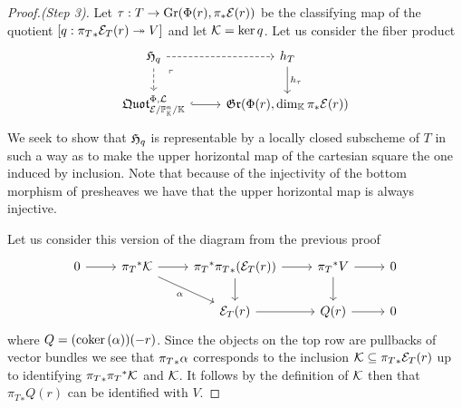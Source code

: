 \begin{proof}[Proof.(Step 3)]
Let $\tau:T\to \mathrm{Gr}(\Phi(r),\pi_\ast\mathcal{E}(r))$ be the classifying map of the quotient $[q:{\pi_T}_\ast\mathcal{E}_T(r)\twoheadrightarrow V]$ and let $\mathcal{K}=\ker q$. Let us consider the fiber product
\[\begin{tikzcd}
	{\Hf_q} & {h_T} \\
	{\quotf^{\Phi,\Lc}_{\Ec/\Pj^n_\K/\K}} & {\gr(\Phi(r),\dim_\K\pi_\ast\Ec(r))}
	\arrow[dashed, from=1-1, to=1-2]
	\arrow[dashed, from=1-1, to=2-1]
	\arrow["{h_\tau}", from=1-2, to=2-2]
	\arrow[""{name=0, anchor=center, inner sep=0}, hook, from=2-1, to=2-2]
	\arrow["\ulcorner"{anchor=center, pos=0.125}, draw=none, from=1-1, to=0]
\end{tikzcd}\]
We seek to show that $\mathfrak{H}_q$ is representable by a locally closed subscheme of $T$ in such a way as to make the upper horizontal map of the cartesian square the one induced by inclusion. Note that because of the injectivity of the bottom morphism of presheaves we have that the upper horizontal map is always injective. 

Let us consider this version of the diagram from the previous proof
\[\begin{tikzcd}
	0 & {{\pi_T}^\ast\Kc} & {{\pi_T}^\ast{\pi_T}_\ast(\Ec_T(r))} & {{\pi_T}^\ast V} & 0 \\
	&& {\Ec_T(r)} & {Q(r)} & 0
	\arrow[from=1-1, to=1-2]
	\arrow[from=1-2, to=1-3]
	\arrow["\al"', from=1-2, to=2-3]
	\arrow[from=1-3, to=1-4]
	\arrow[from=1-3, to=2-3]
	\arrow[from=1-4, to=1-5]
	\arrow[from=1-4, to=2-4]
	\arrow[from=2-3, to=2-4]
	\arrow[from=2-4, to=2-5]
\end{tikzcd}\]
where $Q=(\mathrm{coker}\,(\alpha))(-r)$. Since the objects on the top row are pullbacks of vector bundles we see that ${\pi_T}_\ast\alpha$ corresponds to the inclusion $\mathcal{K}\subseteq {\pi_T}_\ast\mathcal{E}_T(r)$ up to identifying ${\pi_T}_\ast{\pi_T}^\ast\mathcal{K}$ and $\mathcal{K}$. It follows by the definition of $\mathcal{K}$ then that ${\pi_T}_\ast Q(r)$ can be identified with $V$.


\end{proof}
